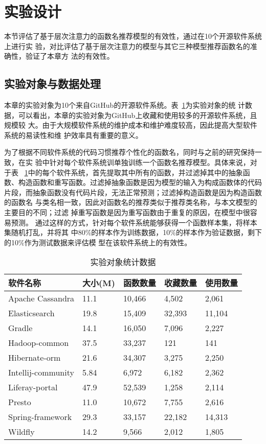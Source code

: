 \section{实验设计}
本节评估了基于层次注意力的函数名推荐模型的有效性，通过在10个开源软件系统上进行实
验，对比评估了基于层次注意力的模型与其它三种模型推荐函数名的准确性，验证了本章方
法的有效性。

\subsection{实验对象与数据处理}
本章的实验对象为10个来自GitHub的开源软件系统。表~\ref{benchmark3}为实验对象的统
计数据，可以看出，本章的实验对象为GitHub上收藏和使用较多的开源软件系统，且规模较
大。由于大规模软件系统的维护成本和维护难度较高，因此提高大型软件系统的易读性和维
护效率具有重要的意义。


为了根据不同软件系统的代码习惯推荐个性化的函数名，同时与之前的研究保持一致，在实
验中针对每个软件系统训单独训练一个函数名推荐模型。具体来说，对于表
~\ref{benchmark3}中的每个软件系统，首先提取其中所有的函数，并过滤掉其中的抽象函
数、构造函数和重写函数。过滤掉抽象函数是因为模型的输入为构成函数体的代码
片段，而抽象函数没有代码片段，无法正常预测；过滤掉构造函数是因为构造函数的函数名
与类名相一致，因此对函数名的推荐类似于推荐类名称，与本文模型的主要目的不同；过滤
掉重写函数是因为重写函数由于重复的原因，在模型中很容易预测。
通过这样的方式，针对每个软件系统能够获得一个函数样本集，将样本集随机打乱，并将其
中80\%的样本作为训练数据，10\%的样本作为验证数据，剩下的10\%作为测试数据来评估模
型在该软件系统上的有效性。

\begin{table}[!t]
\zihaowu
\renewcommand{\arraystretch}{1.4}
\caption{实验对象统计数据}
\label{benchmark3}
\centering
\begin{tabular}{l@{\quad}l@{\quad}l@{\quad}l@{\quad}l}
\toprule 
软件名称 &大小(M) &函数数量 &收藏数量 &使用数量\\ 
\midrule
Apache Cassandra &11.1 &10,466 &4,502 &2,061\\ 
Elasticsearch &19.8 &15,409 &32,393 &11,104\\ 
Gradle &14.1 &16,050 &7,096 &2,227\\ 
Hadoop-common &37.5 &33,237 &121 &141\\ 
Hibernate-orm &21.6 &34,307 &3,275 &2,250\\ 
Intellij-community &5.84 &6,972 &6,182 &2,362\\ 
Liferay-portal &47.9 &52,539 &1,258 &2,114\\ 
Presto &11.0 &10,672 &7,755 &2,616\\ 
Spring-framework &29.3 &33,157 &22,182 &14,313\\ 
Wildfly &14.2 &9,566 &2,012 &1,805\\ 
\bottomrule
\end{tabular}
\end{table}

